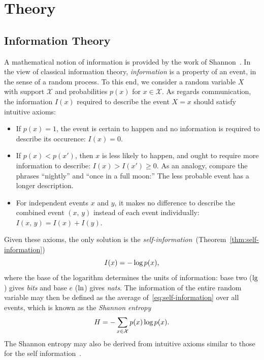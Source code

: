 \documentclass[aps,reprint]{revtex4-2}
\renewcommand\mathrm\textnormal%
\theoremstyle{plain}
\theoremstyle{definition}
\renewcommand\geq\geqslant%
\renewcommand\ln{\operatorname{\mathrm{ln}}}
\renewcommand\lg{\operatorname{\mathrm{lg}}}
\renewcommand\log{\operatorname{\mathrm{log}}}
\begin{document}
\section{Theory}

\subsection{Information Theory}\label{sec:information-theory}

A mathematical notion of information is provided by the work of
Shannon~\cite{shannon1948mathematical}. In the view of classical information
theory, \emph{information} is a property of an event, in the sense of a random
process. To this end, we consider a random variable $X$ with support
$\mathcal{X}$ and probabilities $p(x)$ for $x \in \mathcal{X}$. As regards
communication, the information $I(x)$ required to describe the event $X = x$
should satisfy intuitive axioms:
\begin{itemize}
  \item If $p(x) = 1$, the event is certain to happen and no information is
    required to describe its occurence: $I(x) = 0$.
  \item If $p(x) < p(x')$, then $x$ is less likely to happen, and ought to
    require more information to describe: $I(x) > I(x') \geq 0$. As an analogy,
    compare the phrases ``nightly'' and ``once in a full moon:'' The less
    probable event has a longer description.
  \item For independent events $x$ and $y$, it makes no difference to describe
    the combined event $(x,\, y)$ instead of each event individually: $I(x,\, y)
    = I(x) + I(y)$.
\end{itemize}

Given these axioms, the only solution is the
\emph{self-information}~(Theorem~\ref{thm:self-information})
\begin{equation}
  I(x)
  = -\log p(x),
  \label{eq:self-information}
\end{equation}
where the base of the logarithm determines the units of information: base two
($\lg$) gives \emph{bits} and base $e$ ($\ln$) gives \emph{nats}. The
information of the entire random variable may then be defined as the average
of~\eqref{eq:self-information} over all events, which is known as the
\emph{Shannon entropy}
\begin{equation}
  H
  = -\sum_{x \in \mathcal{X}} p(x) \log p(x).
  \label{eq:shannon-entropy}
\end{equation}
The Shannon entropy may also be derived from intuitive axioms similar to those
for the self information~\cite{shannon1948mathematical,jaynes1957information}.
\end{document}
